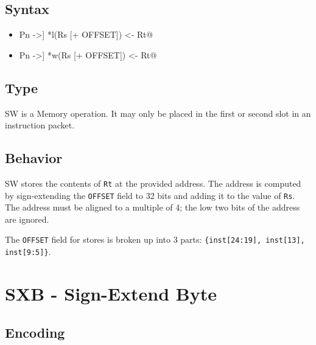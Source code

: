 \documentclass[11pt,openany]{report}
\begin{document}
\subsection{Syntax}

\begin{itemize}
  \item \verb@[[!]Pn ->] *l(Rs [+ OFFSET]) <- Rt@
  \item \verb@[[!]Pn ->] *w(Rs [+ OFFSET]) <- Rt@
\end{itemize}

\subsection{Type}
SW is a Memory operation. It may only be placed in the first or second slot in an instruction packet.

\subsection{Behavior}
SW stores the contents of \texttt{Rt} at the provided address. The address is computed by sign-extending the \texttt{OFFSET} field to 32 bits and adding it to the value of \texttt{Rs}. The address must be aligned to a multiple of 4; the low two bits of the address are ignored.

\noindent
The \texttt{OFFSET} field for stores is broken up into 3 parts: \verb#{inst[24:19], inst[13], inst[9:5]}#.


\pagebreak
\section{SXB - Sign-Extend Byte}
\label{sec:sxbinst}

\subsection{Encoding}
\end{document}
